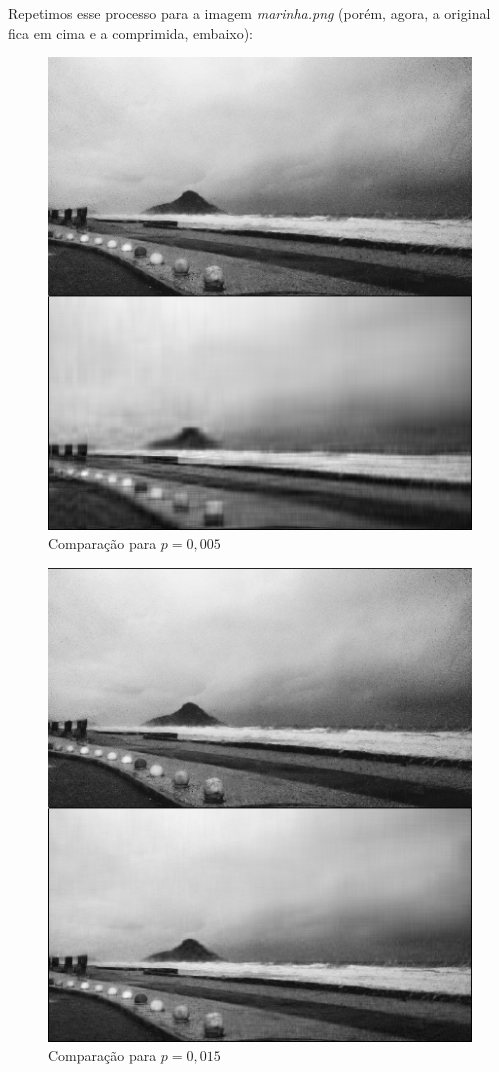 \documentclass[11pt]{article}
\begin{document}
\begin{enumerate}
            Repetimos esse processo para a imagem \textit{marinha.png} (porém, agora, a original fica em cima e a comprimida, embaixo):
            
            \begin{figure}[H]
                \centering
                \includegraphics[]{2-2-005}
                \caption{Comparação para $p = 0,005$}
            \end{figure}
            
            \begin{figure}[H]
                \centering
                \includegraphics[]{2-2-015}
                \caption{Comparação para $p = 0,015$}
            \end{figure}
            

\end{enumerate}
\end{document}

